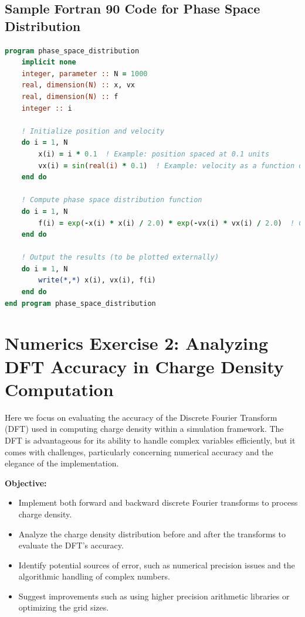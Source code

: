 \documentclass{article}
\begin{document}
\subsection*{Sample Fortran 90 Code for Phase Space Distribution}
\begin{lstlisting}[language=fortran]
program phase_space_distribution
    implicit none
    integer, parameter :: N = 1000
    real, dimension(N) :: x, vx
    real, dimension(N) :: f
    integer :: i

    ! Initialize position and velocity
    do i = 1, N
        x(i) = i * 0.1  ! Example: position spaced at 0.1 units
        vx(i) = sin(real(i) * 0.1)  ! Example: velocity as a function of position
    end do

    ! Compute phase space distribution function
    do i = 1, N
        f(i) = exp(-x(i) * x(i) / 2.0) * exp(-vx(i) * vx(i) / 2.0)  ! Gaussian distribution example
    end do

    ! Output the results (to be plotted externally)
    do i = 1, N
        write(*,*) x(i), vx(i), f(i)
    end do
end program phase_space_distribution
\end{lstlisting}

\newpage

\section*{Numerics Exercise 2: Analyzing DFT Accuracy in Charge Density Computation}

Here we focus on evaluating the accuracy of the Discrete Fourier Transform (DFT) used in computing charge density within a simulation framework. The DFT is advantageous for its ability to handle complex variables efficiently, but it comes with challenges, particularly concerning numerical accuracy and the elegance of the implementation.

\vspace{3mm}

\textbf{Objective:}
\begin{itemize}
    \item Implement both forward and backward discrete Fourier transforms to process charge density.
    \item Analyze the charge density distribution before and after the transforms to evaluate the DFT’s accuracy.
    \item Identify potential sources of error, such as numerical precision issues and the algorithmic handling of complex numbers.
    \item Suggest improvements such as using higher precision arithmetic libraries or optimizing the grid sizes.
\end{itemize}
\end{document}
